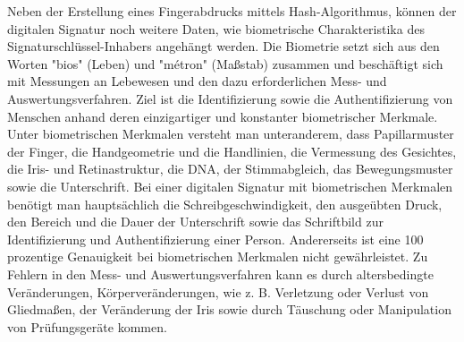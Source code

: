 Neben der Erstellung eines Fingerabdrucks mittels Hash-Algorithmus, können der digitalen Signatur noch weitere Daten, wie biometrische Charakteristika des Signaturschlüssel-Inhabers angehängt werden. Die Biometrie setzt sich aus den Worten "bios" (Leben) und "métron" (Maßstab) zusammen und beschäftigt sich mit Messungen an Lebewesen und den dazu erforderlichen Mess- und Auswertungsverfahren. \cite{bioMet1} Ziel ist die Identifizierung sowie die Authentifizierung von Menschen anhand deren einzigartiger und konstanter biometrischer Merkmale. Unter biometrischen Merkmalen versteht man unteranderem, dass Papillarmuster der Finger, die Handgeometrie und die Handlinien, die Vermessung des Gesichtes, die Iris- und Retinastruktur, die DNA, der Stimmabgleich, das Bewegungsmuster sowie die Unterschrift. Bei einer digitalen Signatur mit biometrischen Merkmalen benötigt man hauptsächlich die Schreibgeschwindigkeit, den ausgeübten Druck, den Bereich und die Dauer der Unterschrift sowie das Schriftbild zur Identifizierung und Authentifizierung einer Person. Andererseits ist eine 100 prozentige Genauigkeit bei biometrischen Merkmalen nicht gewährleistet. Zu Fehlern in den Mess- und Auswertungsverfahren kann es durch altersbedingte Veränderungen, Körperveränderungen, wie z. B. Verletzung oder Verlust von Gliedmaßen, der Veränderung der Iris sowie durch Täuschung oder Manipulation von Prüfungsgeräte kommen. \cite{bioMet2}\cite{bioMet3}
